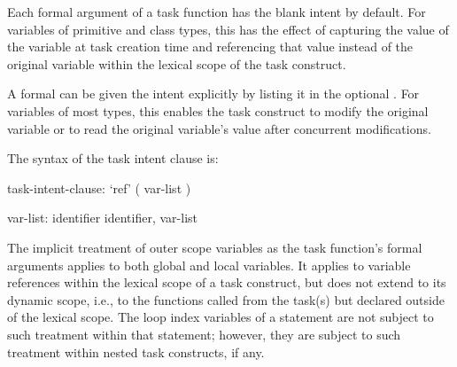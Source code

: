 Each formal argument of a task function has the blank intent by default.
For variables of primitive and class types, this has the effect
of capturing the value of the variable at task creation time
and referencing that value instead of the original variable
within the lexical scope of the task construct.

A formal can be given the  intent explicitly by listing it
in the optional . For variables of most
types, this enables the task construct to modify the original variable
or to read the original variable's value after concurrent modifications.

The syntax of the task intent clause is:

\begin{syntax}
task-intent-clause:
  `ref' ( var-list )

var-list:
  identifier
  identifier, var-list
\end{syntax}

The implicit treatment of outer scope variables as the task function's
formal arguments applies to both global and local variables.
It applies to variable references within the lexical scope
of a task construct, but does not extend to its dynamic scope, i.e.,
to the functions called from the task(s) but declared outside of
the lexical scope.
The loop index variables of a  statement are not
subject to such treatment within that statement; however, they are
subject to such treatment within nested task constructs, if any.


